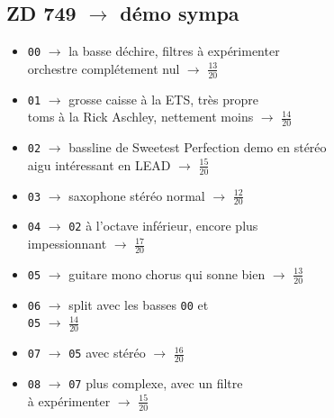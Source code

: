 \documentclass[a4paper, 13pt]{article}
\begin{document}
\subsection*{ZD 749 $\rightarrow$ démo sympa}
\begin{itemize}
    \item \texttt{00} $\rightarrow$ la basse déchire, filtres à expérimenter \\orchestre complétement nul $\rightarrow$ \Large{$\frac{13}{20}$} \normalsize \vspace{0.2cm}
    \item \texttt{01} $\rightarrow$ grosse caisse à la ETS, très propre \\toms à la Rick Aschley, nettement moins  $\rightarrow$ \Large{$\frac{14}{20}$} \normalsize \vspace{0.2cm}
    \item \texttt{02} $\rightarrow$ bassline de Sweetest Perfection demo en stéréo \\aigu intéressant en LEAD $\rightarrow$ \Large{$\frac{15}{20}$} \normalsize \vspace{0.2cm}
    \item \texttt{03} $\rightarrow$ saxophone stéréo normal $\rightarrow$ \Large{$\frac{12}{20}$} \normalsize \vspace{0.2cm}
    \item \texttt{04} $\rightarrow$ \texttt{02} à l'octave inférieur, encore plus \\impessionnant $\rightarrow$ \Large{$\frac{17}{20}$} \normalsize \vspace{0.2cm}
    \item \texttt{05} $\rightarrow$ guitare mono chorus qui sonne bien $\rightarrow$ \Large{$\frac{13}{20}$} \normalsize \vspace{0.2cm}
    \item \texttt{06} $\rightarrow$ split avec les basses \texttt{00} et \\\texttt{05} $\rightarrow$ \Large{$\frac{14}{20}$} \normalsize \vspace{0.2cm}
    \item \texttt{07} $\rightarrow$ \texttt{05} avec stéréo $\rightarrow$ \Large{$\frac{16}{20}$} \normalsize \vspace{0.2cm}
    \item \texttt{08} $\rightarrow$ \texttt{07} plus complexe, avec un filtre \\à expérimenter $\rightarrow$ \Large{$\frac{15}{20}$} \normalsize \vspace{0.2cm}

\end{itemize}
\end{document}
